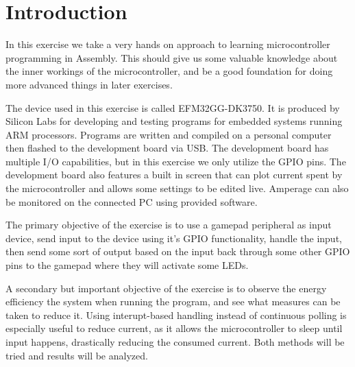 \chapter{Introduction}
In this exercise we take a very hands on approach to learning microcontroller programming in Assembly. This should give us some valuable knowledge about the inner workings of the microcontroller, and be a good foundation for doing more advanced things in later exercises.

The device used in this exercise is called EFM32GG-DK3750. It is produced by Silicon Labs for developing and testing programs for embedded systems running ARM processors. Programs are written and compiled on a personal computer then flashed to the development board via USB. The development board has multiple I/O capabilities, but in this exercise we only utilize the GPIO pins. The development board also features a built in screen that can plot current spent by the microcontroller and allows some settings to be edited live. Amperage can also be monitored on the connected PC using provided software.

The primary objective of the exercise is to use a gamepad peripheral as input device, send input to the device using it's GPIO functionality, handle the input, then send some sort of output based on the input back through some other GPIO pins to the gamepad where they will activate some LEDs.

A secondary but important objective of the exercise is to observe the energy efficiency the system when running the program, and see what measures can be taken to reduce it. Using interupt-based handling instead of continuous polling is especially useful to reduce current, as it allows the microcontroller to sleep until input happens, drastically reducing the consumed current. Both methods will be tried and results will be analyzed.
